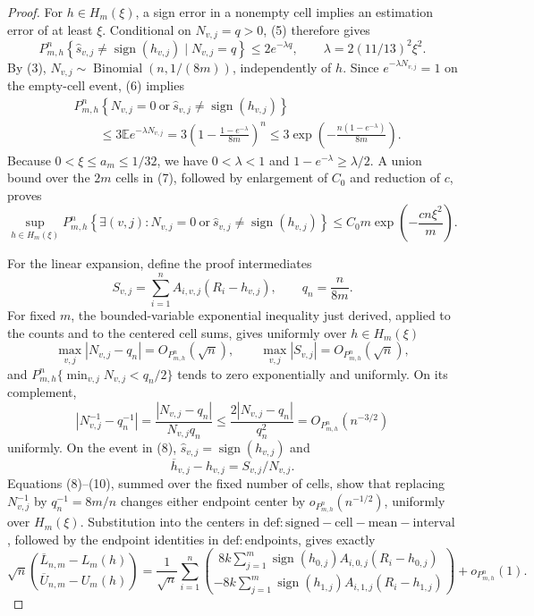 \documentclass{article}
\begin{document}
\begin{proof}
For \(h\in H_m(\xi)\), a sign error in a nonempty cell implies an estimation error of at least \(\xi\). Conditional on \(N_{v,j}=q>0\), (5) therefore gives
\[
 P_{m,h}^{n}\!\left\{\widehat s_{v,j}\neq\operatorname{sign}(h_{v,j})\mid N_{v,j}=q\right\}
 \leq2e^{-\lambda q},
 \qquad \lambda=2(11/13)^2\xi^2.                                      \tag{6}
\]
By (3), \(N_{v,j}\sim\operatorname{Binomial}(n,1/(8m))\), independently of \(h\). Since \(e^{-\lambda N_{v,j}}=1\) on the empty-cell event, (6) implies
\[
 \begin{split}
 &P_{m,h}^{n}\!\left\{N_{v,j}=0\ \text{or}\ \widehat s_{v,j}\neq\operatorname{sign}(h_{v,j})\right\}\\
 &\qquad\leq3\mathbb E e^{-\lambda N_{v,j}}
 =3\left(1-\frac{1-e^{-\lambda}}{8m}\right)^n
 \leq3\exp\left(-\frac{n(1-e^{-\lambda})}{8m}\right).                 \tag{7}
 \end{split}
\]
Because \(0<\xi\leq a_m\leq1/32\), we have \(0<\lambda<1\) and \(1-e^{-\lambda}\geq\lambda/2\). A union bound over the \(2m\) cells in (7), followed by enlargement of \(C_0\) and reduction of \(c\), proves
\[
 \sup_{h\in H_m(\xi)}P_{m,h}^{n}\!\left\{\exists(v,j):N_{v,j}=0\ \text{or}\ \widehat s_{v,j}\neq\operatorname{sign}(h_{v,j})\right\}
 \leq C_0m\exp\left(-\frac{cn\xi^2}{m}\right).                        \tag{8}
\]

For the linear expansion, define the proof intermediates
\[
 S_{v,j}=\sum_{i=1}^{n}A_{i,v,j}(R_i-h_{v,j}),
 \qquad q_n=\frac{n}{8m}.
\]
For fixed \(m\), the bounded-variable exponential inequality just derived, applied to the counts and to the centered cell sums, gives uniformly over \(h\in H_m(\xi)\)
\[
 \max_{v,j}|N_{v,j}-q_n|=O_{P_{m,h}^{n}}(\sqrt n),
 \qquad
 \max_{v,j}|S_{v,j}|=O_{P_{m,h}^{n}}(\sqrt n),                           \tag{9}
\]
and \(P_{m,h}^{n}\{\min_{v,j}N_{v,j}<q_n/2\}\) tends to zero exponentially and uniformly. On its complement,
\[
 \left|N_{v,j}^{-1}-q_n^{-1}\right|
 =\frac{|N_{v,j}-q_n|}{N_{v,j}q_n}
 \leq\frac{2|N_{v,j}-q_n|}{q_n^2}
 =O_{P_{m,h}^{n}}(n^{-3/2})                                             \tag{10}
\]
uniformly. On the event in (8), \(\widehat s_{v,j}=\operatorname{sign}(h_{v,j})\) and
\[
 \overline h_{v,j}-h_{v,j}=S_{v,j}/N_{v,j}.
\]
Equations (8)--(10), summed over the fixed number of cells, show that replacing \(N_{v,j}^{-1}\) by \(q_n^{-1}=8m/n\) changes either endpoint center by \(o_{P_{m,h}^{n}}(n^{-1/2})\), uniformly over \(H_m(\xi)\). Substitution into the centers in \(\mathrm{def:signed-cell-mean-interval}\), followed by the endpoint identities in \(\mathrm{def:endpoints}\), gives exactly
\[
 \sqrt n
 \binom{\overline L_{n,m}-L_m(h)}{\overline U_{n,m}-U_m(h)}
 =\frac1{\sqrt n}\sum_{i=1}^{n}
 \binom{8k\sum_{j=1}^{m}\operatorname{sign}(h_{0,j})A_{i,0,j}(R_i-h_{0,j})}
 {-8k\sum_{j=1}^{m}\operatorname{sign}(h_{1,j})A_{i,1,j}(R_i-h_{1,j})}
 +o_{P_{m,h}^{n}}(1).                                                    \tag{11}
\]


\end{proof}
\end{document}
